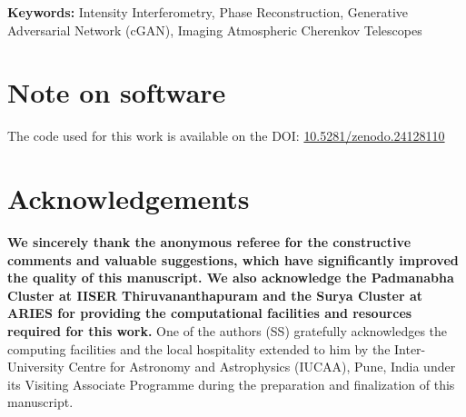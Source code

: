 \documentclass[twocolumn]{openjournal}
\begin{document}
\maketitle

\noindent
\textbf{Keywords:} {{Intensity Interferometry}, {Phase Reconstruction}, {Generative Adversarial Network (cGAN)}, {Imaging Atmospheric Cherenkov Telescopes}}








\section*{Note on software}
The code used for this work is available on the DOI:\hfil\break
\href{https://doi.org/10.5281/zenodo.24128110}{10.5281/zenodo.24128110}

\section*{Acknowledgements}
{\bf We sincerely thank the anonymous referee for the constructive comments and valuable suggestions, which have significantly improved the quality of this manuscript. We also acknowledge the Padmanabha Cluster at IISER Thiruvananthapuram and the Surya Cluster at ARIES for providing the computational facilities and resources required for this work.} One of the authors (SS) gratefully acknowledges the computing facilities and the local hospitality extended to him by the Inter-University Centre for Astronomy and Astrophysics (IUCAA), Pune, India under its Visiting Associate Programme during the preparation and finalization of this manuscript.



\end{document}
